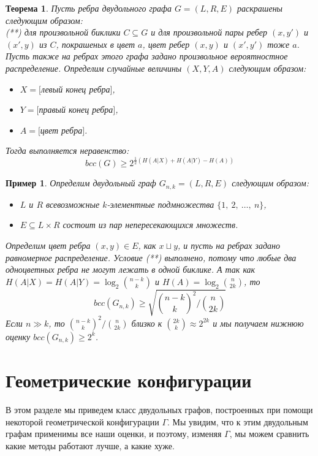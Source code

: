 \documentclass[a4paper]{article}
\newtheorem{mtheorem}{Теорема}[section]
\newtheorem*{mexample}{Пример}
\begin{document}
\begin{mtheorem}
    Пусть ребра двудольного графа $G = (L, R, E)$ раскрашены следующим образом:\ \\
    (**) для произвольной биклики $C\subseteq G$ и для произвольной пары ребер $(x, y')$ и $(x', y)$ 
    из $C$, покрашеных в цвет $a$, цвет ребер $(x, y)$ и $(x', y')$ тоже $a$.\ \\
    Пусть также на ребрах этого графа задано произвольное вероятностное распределение. Определим случайные 
    величины $(X, Y, A)$ следующим образом:
    \begin{itemize}[noitemsep]
        \item $X = [$левый конец ребра$]$, 
        \item $Y = [$правый конец ребра$]$,
        \item $A = [$цвет ребра$]$.
    \end{itemize}
    Тогда выполняется неравенство: $$bcc(G) \geq 2^{\frac{1}{2}(H(A|X) + H(A|Y) - H(A))}$$
\end{mtheorem}

\begin{mexample}
    Определим двудольный граф $G_{n,k} = (L, R, E)$ следующим образом: 
    \begin{itemize}[noitemsep]
        \item $L$ и $R$ всевозможные $k$-элементные подмножества $\{1,\ 2,\ \ldots,\ n\}$,
        \item $E\subseteq L\times R$ состоит из пар непересекающихся множеств.
    \end{itemize}
    Определим цвет ребра $(x, y)\in E$, как $x\sqcup y$, и пусть на ребрах задано равномерное распределение.
    Условие (**) выполнено, потому что любые два одноцветных ребра не могут лежать в одной биклике. А так как 
    $H(A|X) = H(A|Y) = \log_2\binom{n-k}{k}$ и $H(A) = \log_2\binom{n}{2k}$, то $$bcc(G_{n,k}) \geq 
    \sqrt{\binom{n-k}{k}^2 / \binom{n}{2k}}$$
    Если $n \gg k$, то $\binom{n-k}{k}^2 / \binom{n}{2k}$ близко к $\binom{2k}{k}\approx 2^{2k}$ и мы 
    получаем нижнюю оценку $bcc(G_{n,k})\geq 2^k$.
\end{mexample}

\setcounter{mclaim}{0}
\setcounter{mlemma}{0}
\setcounter{mtheorem}{0}
\addtocounter{section}{1}
\section*{Геометрические конфигурации}
В этом разделе мы приведем класс двудольных графов, построенных при помощи некоторой геометрической 
конфигурации $\Gamma$. Мы увидим, что к этим двудольным графам применимы все наши оценки, и поэтому, 
изменяя $\Gamma$, мы можем сравнить какие методы работают лучше, а какие хуже.
\end{document}

